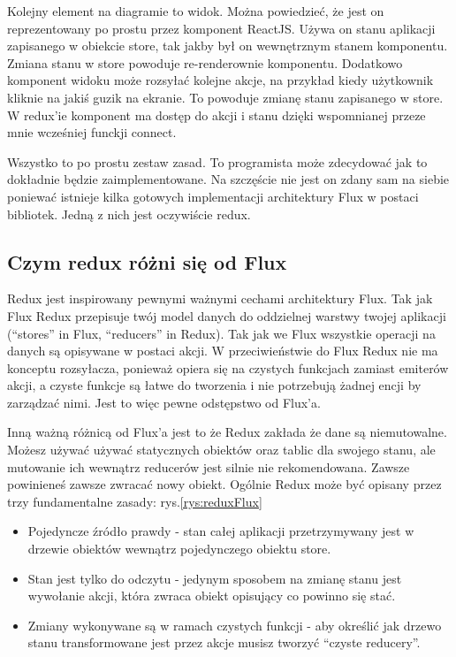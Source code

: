 Kolejny element na diagramie to widok. Można powiedzieć, że jest on reprezentowany po prostu przez komponent ReactJS. Używa on stanu aplikacji zapisanego w obiekcie store, tak jakby był on wewnętrznym stanem komponentu. Zmiana stanu w store powoduje re-renderownie komponentu. Dodatkowo komponent widoku może rozsyłać kolejne akcje, na przykład kiedy użytkownik kliknie na jakiś guzik na ekranie. To powoduje zmianę stanu zapisanego w store.
W redux'ie komponent ma dostęp do akcji i stanu dzięki wspomnianej przeze mnie wcześniej funckji connect.

Wszystko to po prostu zestaw zasad. To programista może zdecydować jak to dokładnie będzie zaimplementowane. Na szczęście nie jest on zdany sam na siebie poniewać istnieje kilka gotowych implementacji architektury Flux w postaci bibliotek.\cite{www_nafrontendzie}
Jedną z nich jest oczywiście redux.

\subsection{Czym redux różni się od Flux}

Redux jest inspirowany pewnymi ważnymi cechami architektury Flux. Tak jak Flux Redux przepisuje twój model danych do oddzielnej warstwy twojej aplikacji (“stores” in Flux, “reducers” in Redux). Tak jak we Flux wszystkie operacji na danych są opisywane w postaci akcji. W przeciwieństwie do Flux Redux nie ma konceptu rozsyłacza, ponieważ opiera się na czystych funkcjach zamiast emiterów akcji, a czyste funkcje są łatwe do tworzenia i nie potrzebują żadnej encji by zarządzać nimi. Jest to więc pewne odstępstwo od Flux’a.\cite{www_nafrontendzie} 

Inną ważną różnicą od Flux’a jest to że Redux zakłada że dane są niemutowalne. Możesz używać używać statycznych obiektów oraz tablic dla swojego stanu, ale mutowanie ich wewnątrz reducerów jest silnie nie rekomendowana. Zawsze powinieneś zawsze zwracać nowy obiekt. Ogólnie Redux może być opisany przez trzy fundamentalne zasady:
rys.\ref{rys:reduxFlux}
\begin{itemize}
	\item Pojedyncze źródło prawdy - stan całej aplikacji przetrzymywany jest w drzewie obiektów wewnątrz pojedynczego obiektu store.
	\item Stan jest tylko do odczytu - jedynym sposobem na zmianę stanu jest wywołanie akcji, która zwraca obiekt opisujący co powinno się stać.
	\item Zmiany wykonywane są w ramach czystych funkcji - aby określić jak drzewo stanu transformowane jest przez akcje musisz tworzyć “czyste reducery”.
\end{itemize}

